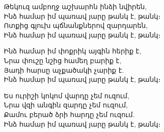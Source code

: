 \begin{titlepage}

\null\vfill

\begingroup
\sffamily\small
Թեկուզ ամբողջ աշխարհն ինձի նվիրեն, \\
Ինձ համար իմ պառավ յարը թանկ է, թանկ։ \\
Ոտքից գլուխ պճնանքներով զարդարեն, \\
Ինձ համար իմ պառավ յարը թանկ է, թանկ։

Ինձ համար իմ փոքրիկ այգին հերիք է, \\
Նրա փուշը նշից համեղ բարիք է, \\
Յադի հարսը աչքածակի չարիք է. \\
Ինձ համար իմ պառավ յարը թանկ է, թանկ։

Ես ուրիշի կոկոմ վարդը չեմ ուզում, \\
Նրա վզի անգին զարդը չեմ ուզում, \\
Քամու բերած ձրի հարդը չեմ ուզում. \\
Ինձ համար իմ պառավ յարը թանկ է, թանկ։

\endgroup

\vfill\null

\end{titlepage}
